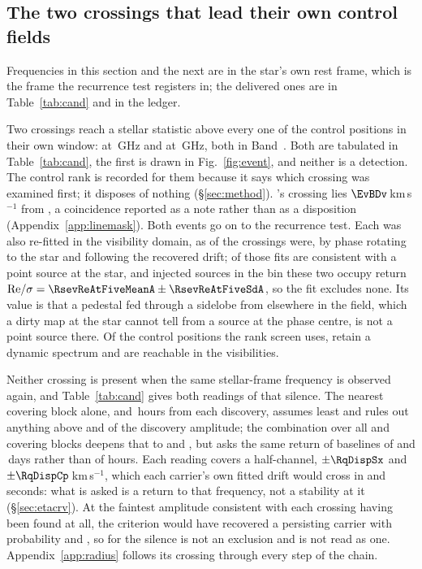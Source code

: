 \subsection{The two crossings that lead their own control fields}
\label{sec:vistest}

Frequencies in this section and the next are in the star's own rest frame,
which is the frame the recurrence test registers in; the delivered ones are in
Table~\ref{tab:cand} and in the ledger.

Two crossings reach a stellar statistic above every one of the \NCtrl{}
control positions in their own window: \EvAStar{} at \RqFreqSx\,GHz and
\EvBStar{} at \RqFreqCp\,GHz, both in Band~\EvABand. Both are tabulated in
Table~\ref{tab:cand}, the first is drawn in Fig.~\ref{fig:event}, and neither
is a detection. The control rank is recorded for them because it says which
crossing was examined first; it disposes of nothing (\S\ref{sec:method}).
\EvBStar's crossing lies $\EvBDv$\,km\,s$^{-1}$ from \EvBLine, a coincidence
reported as a note rather than as a disposition
(Appendix~\ref{app:linemask}). Both events go on to the recurrence test. Each
was also re-fitted in the visibility domain, as \LgNFit{} of the \NCross{}
crossings were, by phase rotating to the star and following the recovered
drift; \LgNLocalCor{} of those fits are consistent with a point source at the
star, and injected sources in the bin these two occupy return
${\rm Re}/\sigma=\RsevReAtFiveMeanA\pm\RsevReAtFiveSdA$, so the fit excludes
none. Its value is that a pedestal fed through a sidelobe from elsewhere in
the field, which a dirty map at the star cannot tell from a source at the
phase centre, is not a point source there. Of the \NCtrl{} control positions
the rank screen uses, \RcNRetCtrl{} retain a dynamic spectrum and
\RcNVisCtrl{} are reachable in the visibilities.

Neither crossing is present when the same stellar-frame frequency is observed
again, and Table~\ref{tab:cand} gives both readings of that silence. The
nearest covering block alone, \RcSxNearH{} and \EvBDeepH\,hours from each
discovery, assumes least and rules out anything above \RqNearFracSx{} and
\RqNearFracCp{} of the discovery amplitude; the combination over all
\RqNRepSx{} and \RqNRepCp{} covering blocks deepens that to \RcSxFive{} and
\RcCpFive, but asks the same return of baselines of \RqSpanDSx{} and
\RqSpanDCp\,days rather than of hours. Each reading covers a half-channel,
$\pm\RqDispSx$ and $\pm\RqDispCp$\,km\,s$^{-1}$, which each carrier's own
fitted drift would cross in \ZtSxLeaveSec{} and \ZtCpLeaveSec{} seconds: what
is asked is a return to that frequency, not a stability at it
(\S\ref{sec:etacrv}). At the faintest amplitude consistent with each crossing
having been found at all, the criterion would have recovered a persisting
carrier with probability \RqPowerTrigSx{} and \RqPowerTrigCp, so for
\EvBStar{} the silence is not an exclusion and is not read as one.
Appendix~\ref{app:radius} follows its crossing through every step
of the chain.


